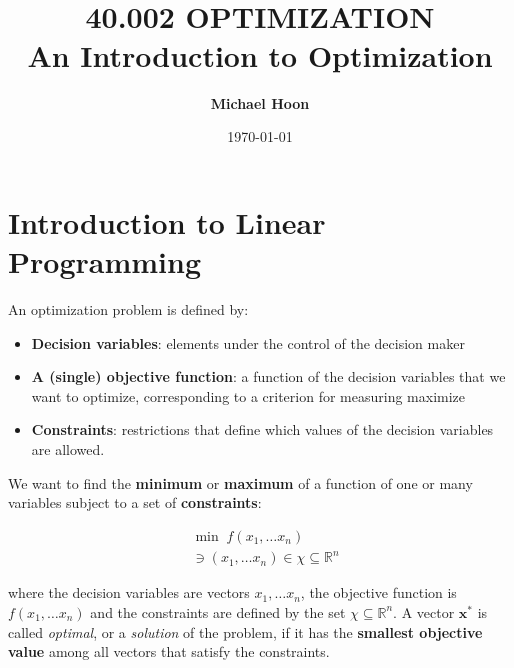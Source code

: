 \documentclass{article}
\begin{document}

\title{ \normalsize \textsc{}
		\\ [2.0cm]
		\HRule{1.5pt} \\
		\LARGE \textbf{\uppercase{40.002 Optimization}
		\HRule{2.0pt} \\ [0.6cm] \LARGE{An Introduction to Optimization} \vspace*{10\baselineskip}}
		}
\date{\today}
\author{\textbf{Michael Hoon}}

\maketitle
\newpage

\tableofcontents
\newpage


\section{Introduction to Linear Programming}
An optimization problem is defined by:

\begin{itemize}
    \item \textbf{Decision variables}: elements under the control of the decision maker
    \item \textbf{A (single) objective function}: a function of the decision variables that we want to optimize, corresponding to a criterion for measuring maximize
    \item \textbf{Constraints}: restrictions that define which values of the decision variables are allowed.
\end{itemize}

\noindent We want to find the \textbf{minimum} or \textbf{maximum} of a function of one or many variables subject to a set of \textbf{constraints}:

\begin{align}
    & \min \; f(x_{1}, \dots x_n) \\ \nonumber
    & \ni(x_{1}, \dots x_n) \in \chi \subseteq \mathbb{R}^{n}
\end{align}

\noindent where the decision variables are vectors $x_{1}, \dots x_n$, the objective function is $f(x_{1}, \dots x_n)$ and the constraints are defined by the set $\chi \subseteq \mathbb{R}^{n}$. A vector $\mathbf{x}^{*}$ is called \textit{optimal}, or a \textit{solution} of the problem, if it has the \textbf{smallest objective value} among all vectors that satisfy the constraints. 
\end{document}
